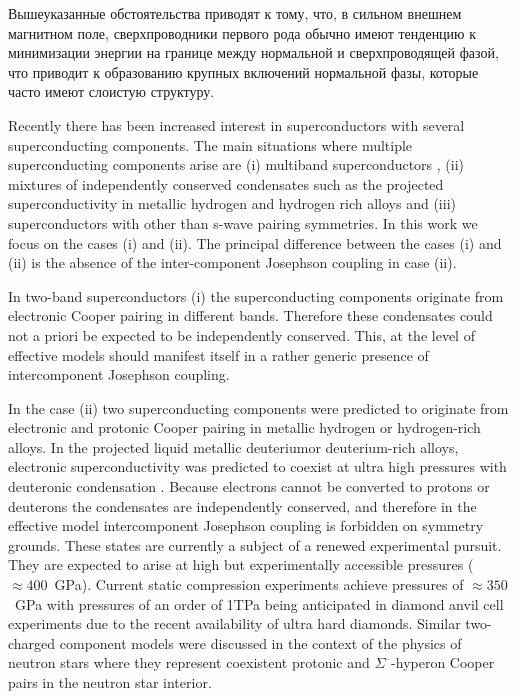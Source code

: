 Вышеуказанные обстоятельства приводят к тому, что, в сильном внешнем магнитном 
поле, сверхпроводники первого рода обычно имеют тенденцию к минимизации 
энергии на границе между нормальной и сверхпроводящей фазой, что приводит к 
образованию крупных включений нормальной фазы, которые часто имеют слоистую 
структуру\cite{bib:4}. 

Recently there has been increased interest in superconductors with several 
superconducting components. The main situations where multiple superconducting 
components arise are (i) multiband superconductors
\cite{bib:6,bib:7,bib:8,bib:9,bib:10,bib:11}, 
(ii) mixtures of independently conserved condensates such as the projected 
superconductivity in metallic hydrogen and hydrogen rich alloys 
\cite{bib:12,bib:13,bib:14} and (iii) superconductors with other than s-wave 
pairing symmetries. In this work we focus on the cases (i) and (ii). The 
principal difference between the cases (i) and (ii) is the absence of the 
inter-component Josephson coupling in case (ii). 

In two-band superconductors (i) the superconducting components originate from 
electronic Cooper pairing in different bands\cite{bib:6}. Therefore these 
condensates could not a priori be expected to be independently conserved. 
This, at the level of effective models should manifest itself in a rather 
generic presence of intercomponent Josephson coupling. 

In the case (ii) two superconducting components were predicted to originate 
from electronic and protonic Cooper pairing in metallic hydrogen or 
hydrogen-rich alloys. In the projected liquid metallic deuteriumor 
deuterium-rich alloys, electronic superconductivity was predicted to coexist 
at ultra high pressures with deuteronic condensation 
\cite{bib:12,bib:13,bib:14}. Because electrons cannot be converted to protons 
or deuterons the condensates are independently conserved, and therefore in the 
effective model intercomponent Josephson coupling is forbidden on symmetry 
grounds. These states are currently a subject of a renewed experimental 
pursuit. They are expected to arise at high but experimentally accessible 
pressures (\( \approx 400 \)~GPa). Current static compression experiments 
achieve pressures of \( \approx 350 \)~GPa with pressures of an order of 
1TPa being anticipated in diamond anvil cell experiments due to the recent 
availability of ultra hard diamonds. Similar two-charged component models 
were discussed in the context of the physics of neutron stars where they 
represent coexistent protonic and \( \Sigma^\text{--} \)-hyperon Cooper pairs 
in the neutron star interior\cite{bib:15}. 

